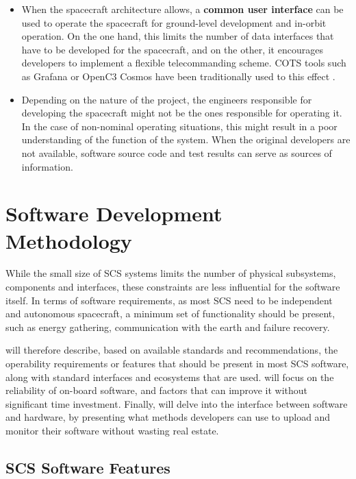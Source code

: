 \documentclass[a4paper,nobib,justified,final]{tufte-book}
\begin{document}
\begin{itemize}[itemsep=-2ex]
	\item When the spacecraft architecture allows, a \textbf{common user interface} can be used to operate the spacecraft for ground-level development and in-orbit operation. On the one hand, this limits the number of data interfaces that have to be developed for the spacecraft, and on the other, it encourages developers to implement a flexible telecommanding scheme. \acs{COTS} tools such as Grafana or OpenC3 Cosmos have been traditionally used to this effect \autocite{slaneyEnhancingGroundStation2024}.
	
	\item Depending on the nature of the project, the engineers responsible for developing the spacecraft might not be the ones responsible for operating it. In the case of non-nominal operating situations, this might result in a poor understanding of the function of the system. When the original developers are not available, software source code and test results can serve as sources of information.
\end{itemize}

\pagebreak[4]
\section{Software Development Methodology}
\label{sec:METHODOLOGY_softwaredevelopment}

While the small size of \acs{SCS} systems limits the number of physical subsystems, components and interfaces, these constraints are less influential for the software itself. In terms of software requirements, as most \acs{SCS} need to be independent and autonomous spacecraft, a minimum set of functionality should be present, such as energy gathering, communication with the earth and failure recovery.

 will therefore describe, based on available standards and recommendations, the operability requirements or features that should be present in most \acs{SCS} software, along with standard interfaces and ecosystems that are used.  will focus on the reliability of on-board software, and factors that can improve it without significant time investment. Finally,  will delve into the interface between software and hardware, by presenting what methods developers can use to upload and monitor their software without wasting real estate.

\subsection[SCS Software Features]{\acs{SCS} Software Features}
\label{sec:METHODOLOGY_software_features}
\end{document}
